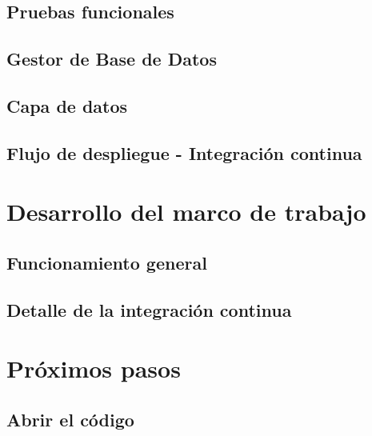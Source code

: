 \documentclass[
  a4paper,  %
  twoside,  %
  bibliography=totoc,
  headsepline,
  cleardoublepage=empty,
  parskip=half,
  draft=false
]{scrbook}
\begin{document}
\section{Pruebas funcionales}
\label{section:e2e-testing}



\section{Gestor de Base de Datos}


\label{section:database-manager}

\section{Capa de datos}


\label{section:data-layer}

\section{Flujo de despliegue - Integración continua}
\label{section:ci-cd-flow}



\chapter{Desarrollo del marco de trabajo}
\label{chap:development}

\section{Funcionamiento general}


\section{Detalle de la integración continua}
\label{chap:ci-cd-detail}


\chapter{Próximos pasos}
\label{chap:further-steps}

\section{Abrir el código}

\end{document}

